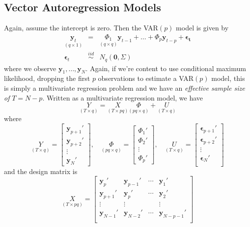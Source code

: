 \subsection{Vector Autoregression Models}
Again, assume the intercept is zero. Then the VAR$(p)$ model is given by
	\begin{eqnarray*}
		\underset{(q\times 1)}{\textbf{y}_t} &=& \underset{(q\times q)}{\Phi_1} \textbf{y}_{t-1} + \hdots + \Phi_{p}\textbf{y}_{t-p} + \boldsymbol{\epsilon_t}\\
		\boldsymbol{\epsilon}_t &\overset{iid}{\sim}& N_q(\mathbf{0}, \Sigma)
	\end{eqnarray*}
where we observe $\mathbf{y}_1, \hdots, \mathbf{y}_N$. Again, if we're content to use conditional maximum likelihood, dropping the first $p$ observations to estimate a VAR$(p)$ model, this is simply a multivariate regression problem and we have an \emph{effective sample size of} $T = N-p$. Written as a multivariate regression model, we have 
	$$\underset{(T\times q)}{Y} = \underset{(T\times pq)}{X}\underset{(pq\times q)}{\Phi}  + \underset{(T\times q)}{U}$$
where 
	$$
	\underset{(T\times q)}{Y} = \left[\begin{array}
		{c} \textbf{y}_{p+1}' \\ \textbf{y}_{p+2}' \\
		\vdots \\ \textbf{y}_{N}' 
	\end{array} \right],\quad
	\underset{(pq\times q)}{\Phi} = \left[\begin{array}
		{c} \Phi_1' \\ \Phi_2' \\ \vdots \\ \Phi_p'
	\end{array} \right],\quad
	\underset{(T\times q)}{U} = \left[\begin{array}
		{c} \boldsymbol{\epsilon}_{p+1}' \\ 
		\boldsymbol{\epsilon}_{p+2}' \\ 
		\vdots \\ 
		\boldsymbol{\epsilon}_{N}' \\ 
	\end{array} \right]
	$$
and the design matrix is
$$\underset{(T\times pq)}{X} = \left[\begin{array}
		{cccc}
		\textbf{y}_p' & \textbf{y}_{p-1}' & \cdots & \textbf{y}_{1}'\\
		\textbf{y}_{p+1}' & \textbf{y}_{p}' & \cdots & \textbf{y}_{2}'\\
		\vdots & \vdots & &\vdots \\
		\textbf{y}_{N-1}' & \textbf{y}_{N-2}' & \cdots & \textbf{y}_{N-p-1}'\\
	\end{array} \right]$$
